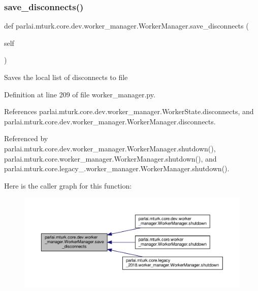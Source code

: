 \subsubsection{\texorpdfstring{save\+\_\+disconnects()}{save\_disconnects()}}
{\footnotesize\ttfamily def parlai.\+mturk.\+core.\+dev.\+worker\+\_\+manager.\+Worker\+Manager.\+save\+\_\+disconnects (\begin{DoxyParamCaption}\item[{}]{self }\end{DoxyParamCaption})}

\begin{DoxyVerb}Saves the local list of disconnects to file\end{DoxyVerb}
 

Definition at line 209 of file worker\+\_\+manager.\+py.



References parlai.\+mturk.\+core.\+dev.\+worker\+\_\+manager.\+Worker\+State.\+disconnects, and parlai.\+mturk.\+core.\+dev.\+worker\+\_\+manager.\+Worker\+Manager.\+disconnects.



Referenced by parlai.\+mturk.\+core.\+dev.\+worker\+\_\+manager.\+Worker\+Manager.\+shutdown(), parlai.\+mturk.\+core.\+worker\+\_\+manager.\+Worker\+Manager.\+shutdown(), and parlai.\+mturk.\+core.\+legacy\+\_.\+worker\+\_\+manager.\+Worker\+Manager.\+shutdown().

Here is the caller graph for this function\+:
\nopagebreak
\begin{figure}[H]
\begin{center}
\leavevmode
\includegraphics[width=350pt]{classparlai_1_1mturk_1_1core_1_1dev_1_1worker__manager_1_1WorkerManager_a4ef70d1871be031e2260ac6948fd3dba_icgraph}
\end{center}
\end{figure}
\mbox{\label{classparlai_1_1mturk_1_1core_1_1dev_1_1worker__manager_1_1WorkerManager_af1fe1df324e27042479dbc71d6565e57}} 
